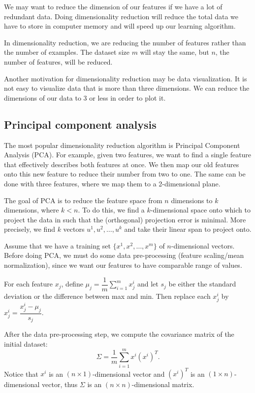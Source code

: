 \documentclass[a4paper,11pt]{report}
\newcommand{\ds}{\displaystyle}
\begin{document}
We may want to reduce the dimension of our features if we have a lot of redundant data. Doing dimensionality reduction will reduce the total data we have to store in computer memory and will speed up our learning algorithm.

In dimensionality reduction, we are reducing the number of features rather than the number of examples. The dataset size $m$ will stay the same, but $n$, the number of features, will be reduced.

Another motivation for dimensionality reduction may be data visualization. It is not easy to visualize data that is more than three dimensions. We can reduce the dimensions of our data to 3 or less in order to plot it.

\subsection*{Principal component analysis}

The most popular dimensionality reduction algorithm is Principal Component Analysis (PCA). For example, given two features, we want to find a single feature that effectively describes both features at once. We then map our old features onto this new feature to reduce their number from two to one. The same can be done with three features, where we map them to a 2-dimensional plane.

The goal of PCA is to reduce the feature space from $n$ dimensions to $k$ dimensions, where $k < n$. To do this, we find a $k$-dimensional space onto which to project the data in such that the (orthogonal) projection error is minimal. More precisely, we find $k$ vectors $u^1, u^2, \ldots, u^k$ and take their linear span to project onto.

Assume that we have a training set $\{x^1, x^2, \ldots, x^m\}$ of $n$-dimensional vectors. Before doing PCA, we must do some data pre-processing (feature scaling/mean normalization), since we want our features to have comparable range of values.

For each feature $x_j$, define $\mu_j = \dfrac{1}{m}\ds\sum_{i=1}^{m}{x^i_j}$ and let $s_j$ be either the standard deviation or the difference between max and min. Then replace each $x_j^i$ by $x_j^i = \dfrac{x_j^i - \mu_j}{s_j}$.

After the data pre-processing step, we compute the covariance matrix of the initial dataset: $$\Sigma = \dfrac{1}{m} \ds\sum_{i=1}^{m}{x^i(x^i)^T}.$$
Notice that $x^i$ is an $(n\times 1)$-dimensional vector and $(x^i)^T$ is an $(1\times n)$-dimensional vector, thus $\Sigma$ is an $(n\times n)$-dimensional matrix.
\end{document}
